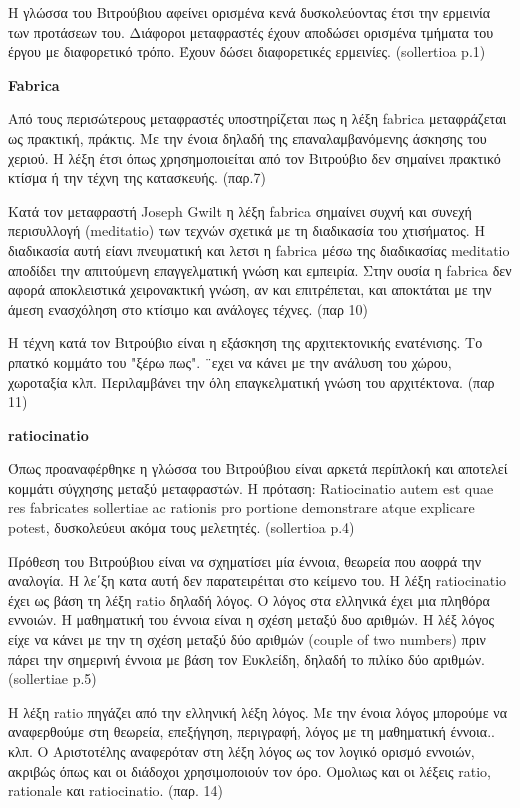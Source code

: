 Η γλώσσα του Βιτρούβιου αφείνει ορισμένα κενά δυσκολεύοντας έτσι την ερμεινία
των προτάσεων του. Διάφοροι μεταφραστές έχουν αποδώσει ορισμένα τμήματα του
έργου με διαφορετικό τρόπο. Έχουν δώσει διαφορετικές ερμεινίες. (sollertioa
p.1)

\textbf{Fabrica}

Από τους περισώτερους μεταφραστές υποστηρίζεται πως η λέξη fabrica μεταφράζεται
ως πρακτική, πράκτις. Με την ένοια δηλαδή της επαναλαμβανόμενης άσκησης του
χεριού. Η λέξη έτσι όπως χρησημοποιείται από τον Βιτρούβιο δεν σημαίνει πρακτικό
κτίσμα ή την τέχνη της κατασκευής. (παρ.7)

Κατά τον μεταφραστή Joseph Gwilt η λέξη fabrica σημαίνει συχνή και συνεχή
περισυλλογή (meditatio) των τεχνών σχετικά με τη διαδικασία του χτισήματος. Η
διαδικασία αυτή είανι πνευματική και λετσι η fabrica μέσω της διαδικασίας
meditatio αποδίδει την απιτούμενη επαγγελματική γνώση και εμπειρία. Στην ουσία η
fabrica δεν αφορά αποκλειστικά χειρονακτική γνώση, αν και επιτρέπεται, και
αποκτάται με την άμεση ενασχόληση στο κτίσιμο και ανάλογες τέχνες. (παρ 10)

Η τέχνη κατά τον Βιτρούβιο είναι η εξάσκηση της αρχιτεκτονικής ενατένισης. Το
ρπατκό κομμάτο του "ξέρω πως". ¨εχει να κάνει με την ανάλυση του χώρου,
χωροταξία κλπ. Περιλαμβάνει την όλη επαγκελματική γνώση του αρχιτέκτονα. (παρ
11)

\textbf{ratiocinatio}

Όπως προαναφέρθηκε η γλώσσα του Βιτρούβιου είναι αρκετά περίπλοκή και αποτελεί
κομμάτι σύγχησης μεταξύ μεταφραστών. Η πρόταση:  Ratiocinatio autem est quae res
fabricates sollertiae ac
 rationis pro portione demonstrare atque explicare
potest, δυσκολεύευι ακόμα τους μελετητές. (sollertioa p.4)

Πρόθεση του Βιτρούβιου είναι να σχηματίσει μία έννοια, θεωρεία που αοφρά την
αναλογία. Η λε΄ξη κατα αυτή δεν παρατειρέιται στο κείμενο του. Η λέξη
ratiocinatio έχει ως βάση τη λέξη ratio δηλαδή λόγος. Ο λόγος στα ελληνικά έχει
μια πληθόρα εννοιών. Η μαθηματική του έννοια είναι η σχέση μεταξύ δυο αριθμών. Η
λέξ λόγος είχε να κάνει με την τη σχέση μεταξύ δύο αριθμών (couple of two
numbers) πριν πάρει την σημερινή έννοια με βάση τον Ευκλείδη, δηλαδή το πιλίκο
δύο αριθμών. (sollertiae p.5)

Η λέξη ratio πηγάζει από την ελληνική λέξη λόγος. Με την ένοια λόγος μπορούμε να
αναφερθούμε στη θεωρεία, επεξήγηση, περιγραφή, λόγος με τη μαθηματική έννοια..
κλπ. Ο Αριστοτέλης αναφερόταν στη λέξη λόγος ως τον λογικό ορισμό εννοιών,
ακριβώς όπως και οι διάδοχοι χρησιμοποιούν τον όρο. Ομολιως και οι λέξεις ratio,
rationale και ratiocinatio. (παρ. 14)

